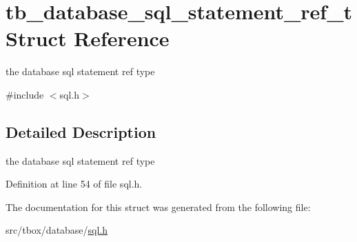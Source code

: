 \hypertarget{structtb__database__sql__statement__ref__t}{\section{tb\-\_\-database\-\_\-sql\-\_\-statement\-\_\-ref\-\_\-t Struct Reference}
\label{structtb__database__sql__statement__ref__t}
}


the database sql statement ref type  




{\ttfamily \#include $<$sql.\-h$>$}



\subsection{Detailed Description}
the database sql statement ref type 

Definition at line 54 of file sql.\-h.



The documentation for this struct was generated from the following file\-:\begin{DoxyCompactItemize}
\item 
src/tbox/database/\hyperlink{sql_8h}{sql.\-h}\end{DoxyCompactItemize}
